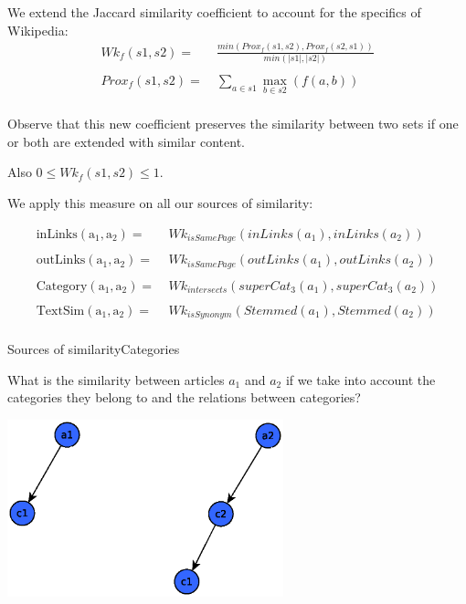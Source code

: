 \documentclass[xcolor=dvipsnames]{beamer}
\newcommand{\textSim}[2]{\mathrm{TextSim(#1,#2)}}
\newcommand{\inLinks}[2]{\mathrm{inLinks(#1,#2)}}
\newcommand{\outLinks}[2]{\mathrm{outLinks(#1,#2)}}
\newcommand{\category}[2]{\mathrm{Category(#1,#2)}}
\newcommand{\wikiJack}[3]{Wk_{#1}(#2,#3)}
\newcommand{\setProximity}[3]{Prox_{#1}(#2,#3)}
\begin{document}



\begin{frame}
We extend the Jaccard similarity coefficient to account for the specifics of Wikipedia:
\begin{align*}	
\wikiJack{f}{s1}{s2} =&\ \frac{min(\setProximity{f}{s1}{s2}, \setProximity{f}{s2}{s1})}{min(|s1|,|s2|)}\\
\\
\setProximity{f}{s1}{s2} =&\ \sum\limits_{a \in s1} \max\limits_{b \in s2}(f(a,b))\\
\end{align*}

Observe that this new coefficient preserves the similarity between two sets if one or both are extended with similar content.

Also $ 0 \leq \wikiJack{f}{s1}{s2} \leq 1 $.
  
\end{frame}


\begin{frame}

We apply this measure on all our sources of similarity: 

\begin{align*}
	\inLinks{a_1}{a_2} =&\ \wikiJack{isSamePage}{inLinks(a_1)}{inLinks(a_2)}\\
	\\
	\outLinks{a_1}{a_2} =&\ \wikiJack{isSamePage}{outLinks(a_1)}{outLinks(a_2)}\\
	\\
	\category{a_1}{a_2} =&\  \wikiJack{intersects}{superCat_3(a_1)}{superCat_3(a_2)}\\
	\\
	\textSim{a_1}{a_2} =&\  \wikiJack{isSynonym}{Stemmed(a_1)}{Stemmed(a_2)}\\
\end{align*}
\end{frame}


\begin{frame}{Sources of similarity}{Categories}


What is the similarity between articles $a_1$ and $a_2$  if we take into account the categories they belong to and the relations between categories?


\begin{center}

\includegraphics[width=0.6\textwidth, height=0.4\paperheight]{media/sim1.eps}

\end{center}

\end{frame}
\end{document}
